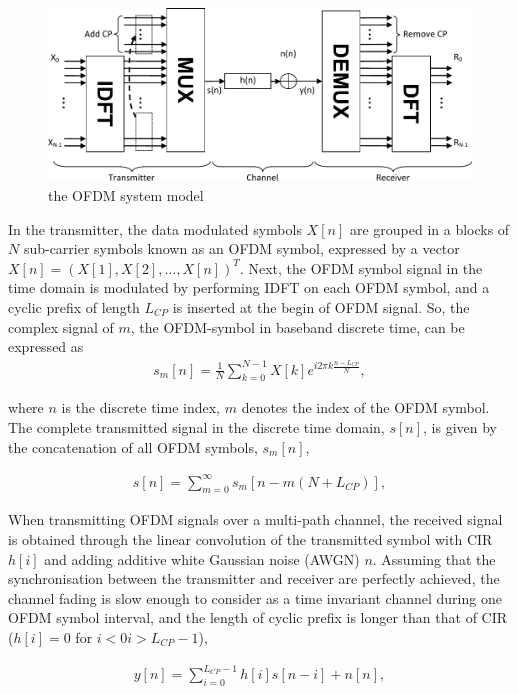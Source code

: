 \begin{figure}
	\centerline{\includegraphics [width=0.8\columnwidth] {Figures/OFDM-model.pdf} }
	\caption{the OFDM system model}
	\label{fig:OFDM-model}
\end{figure}

In the transmitter, the data modulated symbols $X[n]$ are grouped in a blocks of $N$ sub-carrier symbols known as an OFDM symbol, expressed by a vector $X[n]=(X[1], X[2], ..., X[n])^T$. 
Next, the OFDM symbol signal in the time domain is modulated by performing IDFT on each OFDM symbol, and a cyclic prefix of length $L_{CP}$ is inserted at the begin of OFDM signal. 
So, the complex signal of $m$, the OFDM-symbol in baseband discrete time, can be expressed as
\begin{eqnarray}
\label{equ:OFDMsymbol}
s_{m}[n] = \frac{1}{N} \sum_{k=0}^{N-1}X[k]e^{i2\pi k\frac{n-L_{CP}}{N}},
\end{eqnarray} 

where $n$ is the discrete time index, $m$ denotes the index of the OFDM symbol. 
The complete transmitted signal in the discrete time domain, $s[n]$, is given by the concatenation of all OFDM symbols, $s_{m}[n]$,

\begin{eqnarray}
\label{equ:OFDMsignal}
s[n] =  \sum_{m=0}^{\infty} s_{m}[n-m(N+L_{CP})],
\end{eqnarray} 

When transmitting OFDM signals over a multi-path channel, the received signal is obtained through the linear convolution of the transmitted symbol with CIR $h[i]$ and adding additive white Gaussian noise (AWGN) $n$. 
Assuming that the synchronisation between the transmitter and receiver are perfectly achieved, the channel fading is slow enough to consider as a time invariant channel during one OFDM symbol interval, and the length of cyclic prefix is longer than that of CIR ($h[i] = 0$ for $i < 0 i > L_{CP}-1$), 

\begin{eqnarray}
\label{equ:OFDMchannelsignal}
y[n] =  \sum_{i=0}^{L_{CP}-1} h[i]s[n-i] + n[n],
\end{eqnarray} 

